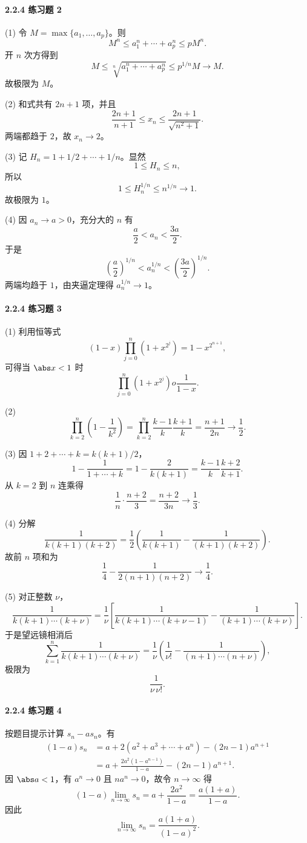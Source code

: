 \paragraph{2.2.4 练习题 2}
\begin{xsolution}
(1) 令 $M=\max\{a_1,\ldots,a_p\}$。则
\[
  M^n\le a_1^n+\cdots+a_p^n\le pM^n.
\]
开 $n$ 次方得到
\[
  M\le\sqrt[n]{a_1^n+\cdots+a_p^n}\le p^{1/n}M\to M.
\]
故极限为 $M$。

(2) 和式共有 $2n+1$ 项，并且
\[
  \frac{2n+1}{n+1}
  \le x_n
  \le\frac{2n+1}{\sqrt{n^2+1}}.
\]
两端都趋于 $2$，故 $x_n\to2$。

(3) 记 $H_n=1+1/2+\cdots+1/n$。显然
\[
  1\le H_n\le n,
\]
所以
\[
  1\le H_n^{1/n}\le n^{1/n}\to1.
\]
故极限为 $1$。

(4) 因 $a_n\to a>0$，充分大的 $n$ 有
\[
  \frac a2<a_n<\frac{3a}{2}.
\]
于是
\[
  \left(\frac a2\right)^{1/n}
  <a_n^{1/n}
  <\left(\frac{3a}{2}\right)^{1/n}.
\]
两端均趋于 $1$，由夹逼定理得 $a_n^{1/n}\to1$。
\end{xsolution}

\paragraph{2.2.4 练习题 3}
\begin{xsolution}
(1) 利用恒等式
\[
  (1-x)\prod_{j=0}^n(1+x^{2^j})=1-x^{2^{n+1}},
\]
可得当 $\abs x<1$ 时
\[
  \prod_{j=0}^n(1+x^{2^j})	o\frac1{1-x}.
\]

(2)
\[
  \prod_{k=2}^n\left(1-\frac1{k^2}\right)
  =\prod_{k=2}^n\frac{k-1}{k}\frac{k+1}{k}
  =\frac{n+1}{2n}\to\frac12.
\]

(3) 因 $1+2+\cdots+k=k(k+1)/2$，
\[
  1-\frac1{1+\cdots+k}
  =1-\frac2{k(k+1)}
  =\frac{k-1}{k}\frac{k+2}{k+1}.
\]
从 $k=2$ 到 $n$ 连乘得
\[
  \frac1n\cdot\frac{n+2}{3}=\frac{n+2}{3n}\to\frac13.
\]

(4) 分解
\[
  \frac1{k(k+1)(k+2)}
  =\frac12\left(\frac1{k(k+1)}-\frac1{(k+1)(k+2)}\right).
\]
故前 $n$ 项和为
\[
  \frac14-\frac1{2(n+1)(n+2)}\to\frac14.
\]

(5) 对正整数 $\nu$，
\[
  \frac1{k(k+1)\cdots(k+\nu)}
  =\frac1\nu\left[
    \frac1{k(k+1)\cdots(k+\nu-1)}
    -\frac1{(k+1)\cdots(k+\nu)}
  \right].
\]
于是望远镜相消后
\[
  \sum_{k=1}^n\frac1{k(k+1)\cdots(k+\nu)}
  =\frac1\nu\left(\frac1{\nu!}-\frac1{(n+1)\cdots(n+\nu)}\right),
\]
极限为
\[
  \boxed{\frac1{\nu\,\nu!}}.
\]
\end{xsolution}

\paragraph{2.2.4 练习题 4}
\begin{xsolution}
按题目提示计算 $s_n-as_n$。有
\begin{align*}
  (1-a)s_n
  &=a+2(a^2+a^3+\cdots+a^n)-(2n-1)a^{n+1}\\
  &=a+\frac{2a^2(1-a^{n-1})}{1-a}-(2n-1)a^{n+1}.
\end{align*}
因 $\abs a<1$，有 $a^n\to0$ 且 $na^n\to0$，故令 $n\to\infty$ 得
\[
  (1-a)\lim_{n\to\infty}s_n
  =a+\frac{2a^2}{1-a}
  =\frac{a(1+a)}{1-a}.
\]
因此
\[
  \boxed{\lim_{n\to\infty}s_n=\frac{a(1+a)}{(1-a)^2}}.
\]
\end{xsolution}

